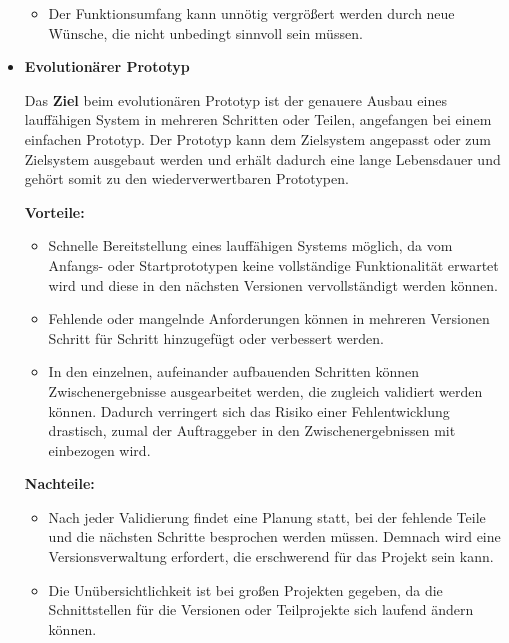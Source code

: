 \documentclass{swp1}
\begin{document}
\begin{itemize}
\begin{itemize}
\item Der Funktionsumfang kann unnötig vergrößert werden durch neue Wünsche, die nicht unbedingt sinnvoll sein müssen.
\end{itemize}

\item \textbf{Evolutionärer Prototyp}

Das \textbf{Ziel} beim evolutionären Prototyp ist der genauere Ausbau eines lauffähigen System in mehreren Schritten oder Teilen, angefangen bei einem einfachen Prototyp. Der Prototyp kann dem Zielsystem angepasst oder zum Zielsystem ausgebaut werden und erhält dadurch eine lange Lebensdauer und gehört somit zu den wiederverwertbaren Prototypen.


\textbf{Vorteile:}

\begin{itemize}
\item Schnelle Bereitstellung eines lauffähigen Systems möglich, da vom Anfangs- oder Startprototypen keine vollständige Funktionalität erwartet wird und diese in den nächsten Versionen vervollständigt werden können.
\end{itemize}

\begin{itemize}
\item Fehlende oder mangelnde Anforderungen können in mehreren Versionen Schritt für Schritt hinzugefügt oder verbessert werden.
\end{itemize}


\begin{itemize}
\item In den einzelnen, aufeinander aufbauenden Schritten können Zwischenergebnisse ausgearbeitet werden, die zugleich validiert werden können. Dadurch verringert sich das Risiko einer Fehlentwicklung drastisch, zumal der Auftraggeber in den Zwischenergebnissen mit einbezogen wird.
\end{itemize}

\textbf{Nachteile:}
\begin{itemize}
\item Nach jeder Validierung findet eine Planung statt, bei der fehlende Teile und die nächsten Schritte besprochen werden müssen. Demnach wird eine Versionsverwaltung erfordert, die erschwerend für das Projekt sein kann.
\end{itemize}

\begin{itemize}
\item Die Unübersichtlichkeit ist bei großen Projekten gegeben, da die Schnittstellen für die Versionen oder Teilprojekte sich laufend ändern können.
\end{itemize}


\end{itemize}
\end{document}
